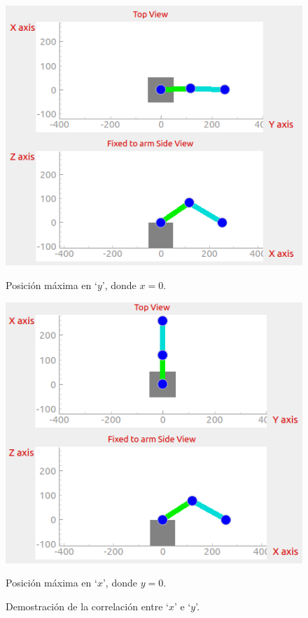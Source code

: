 \begin{figure}[H]
    \begin{minipage}{.45\linewidth}
        \centering
        \includegraphics[width=\linewidth]{pictures/arm_y_max.png}
        \caption{Posición máxima en `$y$', donde $x = 0$.}
    \end{minipage}
    \hfill
    \begin{minipage}{.45\linewidth}
        \centering
        \includegraphics[width=\linewidth]{pictures/arm_x_max.png}
        \caption{Posición máxima en `$x$', donde $y = 0$.}
    \end{minipage}
    \caption{Demostración de la correlación entre `$x$' e `$y$'.}
    \label{fig:arm_limits}
\end{figure}


